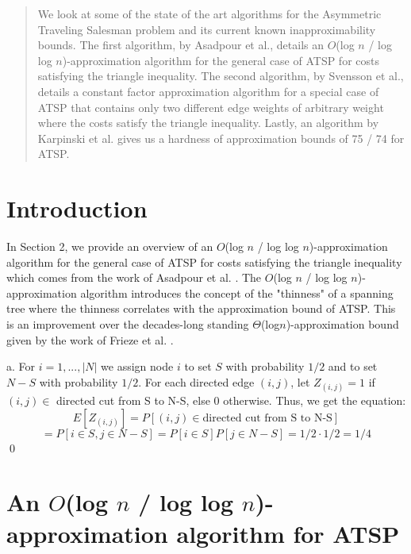 \documentclass[oneside]{projectpaper} %
\begin{document}
\maketitle
\begin{abstract}
We look at some of the state of the art algorithms for the Asymmetric Traveling Salesman problem and its current known inapproximability bounds. The first algorithm, by Asadpour et al.\cite{AGM10}, details an $O$(log $n$ / log log $n$)-approximation algorithm for the general case of ATSP for costs satisfying the triangle inequality. The second algorithm, by Svensson et al.\cite{STV16}, details a constant factor approximation algorithm for a special case of ATSP that contains only two different edge weights of arbitrary weight where the costs satisfy the triangle inequality. Lastly, an algorithm by Karpinski et al.\cite{KLS15} gives us a hardness of approximation bounds of 75 / 74 for ATSP.
\end{abstract}
\section{Introduction}
In Section 2, we provide an overview of an $O$(log $n$ / log log $n$)-approximation algorithm for the general case of ATSP for costs satisfying the triangle inequality which comes from the work of Asadpour et al. \cite{AGM10}. The $O$(log $n$ / log log $n$)-approximation algorithm introduces the concept of the "thinness" of a spanning tree where the thinness correlates with the approximation bound of ATSP. This is an improvement over the decades-long standing $\Theta$(log$n$)-approximation bound given by the work of Frieze et al. \cite{FGM83}.

{\large a.} For $i = 1,...,|N|$ we assign node $i$ to set $S$ with probability $1/2$ and to set $N-S$ with probability $1/2$. For each directed edge $(i, j)$, let $Z_{(i,j)} = 1$ if $(i, j) \in$ directed cut from S to N-S, else 0 otherwise. Thus, we get the equation: $$E[Z_{(i,j)}] = P[(i,j) \in \text{directed cut from S to N-S}]$$ $$= P[i \in S, j \in N-S] = P[i \in  S]P[j \in N-S] = 1/2 \cdot 1/2 = 1/4$$ \hfill\qed

\section{An $O$(log $n$ / log log $n$)-approximation algorithm for ATSP}
\end{document}
